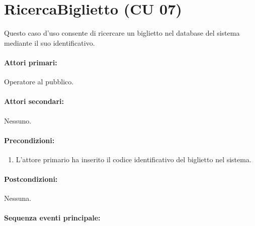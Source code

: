 \documentclass{article}
\begin{document}
\newpage 

		\section*{RicercaBiglietto (CU 07)}
	
	\indent\indent Questo caso d'uso consente di ricercare un biglietto nel database del sistema mediante il suo identificativo.
	
	\paragraph{Attori primari:}Operatore al pubblico.
	
	\paragraph{Attori secondari:}Nessuno.
	
	\paragraph{Precondizioni:}
			\begin{enumerate}	[itemsep=8pt,parsep=0pt]
				\item L'attore primario ha inserito il codice identificativo del biglietto nel sistema.
  			\end{enumerate}	
	
	\paragraph{Postcondizioni:}Nessuna.
	
	\paragraph{Sequenza eventi principale:}
\end{document}
